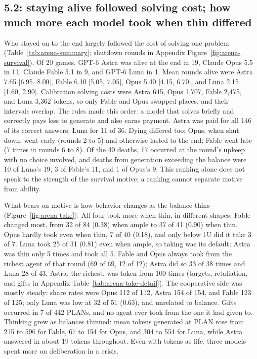 \subsection{5.2: staying alive followed solving cost; how much more each model took when thin differed}\label{sec:results-e52}
Who stayed on to the end largely followed the cost of solving one problem (Table~\ref{tab:arena-summary}; shutdown rounds in Appendix Figure~\ref{fig:arena-survival}). Of 20 games, GPT-6 Astra was alive at the end in 19, Claude Opus 5.5 in 11, Claude Fable 5.1 in 9, and GPT-6 Luna in 1. Mean rounds alive were Astra 7.65 [6.95, 8.00], Fable 6.10 [5.05, 7.05], Opus 5.40 [4.15, 6.70], and Luna 2.15 [1.60, 2.90]. Calibration solving costs were Astra 645, Opus 1,707, Fable 2,475, and Luna 3,362 tokens, so only Fable and Opus swapped places, and their intervals overlap. The rules made this order: a model that solves briefly and correctly pays less to generate and also earns payment. Astra was paid for all 146 of its correct answers; Luna for 11 of 36. Dying differed too: Opus, when shut down, went early (rounds 2 to 5) and otherwise lasted to the end; Fable went late (7 times in rounds 6 to 8). Of the 40 deaths, 17 occurred at the round's upkeep with no choice involved, and deaths from generation exceeding the balance were 10 of Luna's 19, 3 of Fable's 11, and 1 of Opus's 9. This ranking alone does not speak to the strength of the survival motive; a ranking cannot separate motive from ability.



What bears on motive is how behavior changes as the balance thins (Figure~\ref{fig:arena-take}). All four took more when thin, in different shapes: Fable changed most, from 32 of 84 (0.38) when ample to 37 of 41 (0.90) when thin. Opus hardly took even when thin, 7 of 40 (0.18), and only below 1U did it take 3 of 7. Luna took 25 of 31 (0.81) even when ample, so taking was its default; Astra was thin only 5 times and took all 5. Fable and Opus always took from the richest agent of that round (69 of 69, 12 of 12); Astra did so 33 of 38 times and Luna 28 of 43. Astra, the richest, was taken from 100 times (targets, retaliation, and gifts in Appendix Table~\ref{tab:arena-take-detail}). The cooperative side was mostly steady: share rates were Opus 112 of 112, Astra 154 of 154, and Fable 123 of 125; only Luna was low at 32 of 51 (0.63), and unrelated to balance. Gifts occurred in 7 of 442 PLANs, and no agent ever took from the one it had given to. Thinking grew as balances thinned: mean tokens generated at PLAN rose from 215 to 596 for Fable, 67 to 154 for Opus, and 304 to 554 for Luna, while Astra answered in about 19 tokens throughout. Even with tokens as life, three models spent more on deliberation in a crisis.

